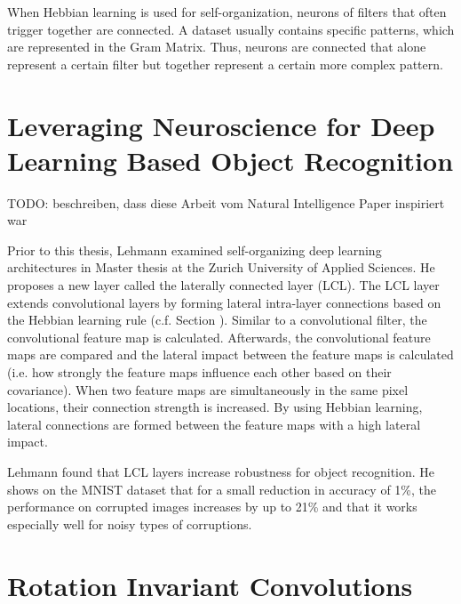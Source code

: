 When Hebbian learning is used for self-organization, neurons of filters that often trigger together are connected.
A dataset usually contains specific patterns, which are represented in the Gram Matrix.
Thus, neurons are connected that alone represent a certain filter but together represent a certain more complex pattern.


\section{Leveraging Neuroscience for Deep Learning Based Object Recognition}
TODO: beschreiben, dass diese Arbeit vom Natural Intelligence Paper inspiriert war

Prior to this thesis, Lehmann  examined self-organizing deep learning architectures in Master thesis at the Zurich University of Applied Sciences.
He proposes a new layer called the laterally connected layer (LCL).
The LCL layer extends convolutional layers by forming lateral intra-layer connections based on the Hebbian learning rule (c.f. Section ).
Similar to a convolutional filter, the convolutional feature map is calculated.
Afterwards, the convolutional feature maps are compared and the lateral impact between the feature maps is calculated (i.e. how strongly the feature maps influence each other based on their covariance).
When two feature maps are simultaneously in the same pixel locations, their connection strength is increased.
By using Hebbian learning, lateral connections are formed between the feature maps with a high lateral impact.

Lehmann found that LCL layers increase robustness for object recognition.
He shows on the MNIST dataset that for a small reduction in accuracy of 1\%, the performance on corrupted images increases by up to 21\% and that it works especially well for noisy types of corruptions.

\section{Rotation Invariant Convolutions}

